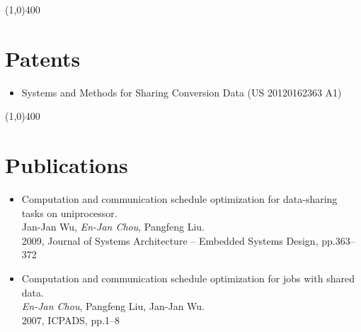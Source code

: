 \documentclass[10pt,a4paper]{article}
\newcommand{\hr}{\noindent\line(1,0){400}}
\newcommand{\br}{\hfill\\}
\begin{document}
\hr
\section*{Patents}
\vskip 0.03in
\begin{itemize}
\item Systems and Methods for Sharing Conversion Data (US 20120162363 A1)
\end{itemize}

\hr
\section*{Publications}
\vskip 0.03in
\begin{itemize}
\item Computation and communication schedule optimization for data-sharing tasks on uniprocessor.\br
Jan-Jan Wu, \emph{En-Jan Chou}, Pangfeng Liu.\br
2009, Journal of Systems Architecture -- Embedded Systems Design, pp.363--372
\item Computation and communication schedule optimization for jobs with shared data.\br
\emph{En-Jan Chou}, Pangfeng Liu, Jan-Jan Wu.\br
2007, ICPADS, pp.1--8
\end{itemize}

%
\end{document}
